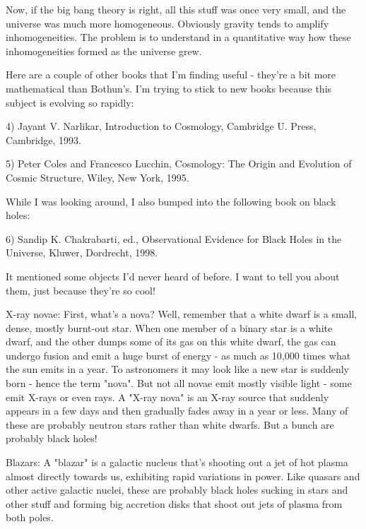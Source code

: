 Now, if the big bang theory is right, all this stuff was once very 
small, and the universe was much more homogeneous.  Obviously gravity
tends to amplify inhomogeneities.  The problem is to understand in a
quantitative way how these inhomogeneities formed as the universe grew.

Here are a couple of other books that I'm finding useful - they're
a bit more mathematical than Bothun's.  I'm trying to stick to new
books because this subject is evolving so rapidly:

4) Jayant V. Narlikar, Introduction to Cosmology, Cambridge U. 
Press, Cambridge, 1993.

5) Peter Coles and Francesco Lucchin, Cosmology: The Origin and
Evolution of Cosmic Structure, Wiley, New York, 1995.

While I was looking around, I also bumped into the following book on
black holes:

6) Sandip K. Chakrabarti, ed., Observational Evidence for Black Holes
in the Universe, Kluwer, Dordrecht, 1998.

It mentioned some objects I'd never heard of before.  I want to tell you
about them, just because they're so cool!

X-ray novae: First, what's a nova?  Well, remember that a white dwarf is
a small, dense, mostly burnt-out star.  When one member of a binary star
is a white dwarf, and the other dumps some of its gas on this white
dwarf, the gas can undergo fusion and emit a huge burst of energy - as
much as 10,000 times what the sun emits in a year.  To astronomers it
may look like a new star is suddenly born - hence the term
"nova".  But not all novae emit mostly visible light - some
emit X-rays or even \gamma  rays.  A "X-ray nova" is an X-ray
source that suddenly appears in a few days and then gradually fades away
in a year or less.  Many of these are probably neutron stars rather than
white dwarfs.  But a bunch are probably black holes!

Blazars: A "blazar" is a galactic nucleus that's shooting out
a jet of hot plasma almost directly towards us, exhibiting rapid
variations in power.  Like quasars and other active galactic nuclei,
these are probably black holes sucking in stars and other stuff and
forming big accretion disks that shoot out jets of plasma from both
poles.

